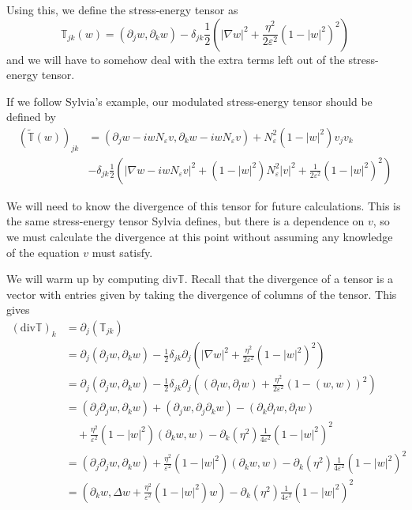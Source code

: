 \documentclass[a4paper]{article}
\renewcommand{\div}{\mathrm{div}}
\begin{document}
Using this, we define the stress-energy tensor as
\begin{equation} \label{eqn:stress_energy}
  \mathbb{T}_{jk}(w) = (\partial_j w, \partial_k w) - \delta_{jk} \frac{1}{2} \left( |\nabla w|^2 + \frac{\eta^2}{2 \varepsilon^2} (1-|w|^2)^2 \right)
\end{equation}
and we will have to somehow deal with the extra terms left out of the stress-energy tensor.

If we follow Sylvia's example, our modulated stress-energy tensor should be defined by
\begin{align} \label{eqn:mod_stress_energy}
  (\tilde{\mathbb{T}}(w))_{jk} &= (\partial_j w- i w N_\varepsilon v, \partial_k w - i w N_\varepsilon v) + N_\varepsilon^2 (1 - |w|^2) v_j v_k
  \nonumber \\
  &- \delta_{jk} \frac{1}{2} \left( |\nabla w - i w N_\varepsilon v|^2 + (1-|w|^2) N_\varepsilon^2 |v|^2 + \frac{1}{2 \varepsilon^2} (1 - |w|^2)^2
  \right)
\end{align}

We will need to know the divergence of this tensor for future calculations. This is the same stress-energy tensor Sylvia defines, but there is a
dependence on $v$, so we must calculate the divergence at this point without assuming any knowledge of the equation $v$ must satisfy.

We will warm up by computing $\div \mathbb{T}$. Recall that the divergence of a tensor is a vector with entries given by taking the divergence of
columns of the tensor. This gives
\begin{align}
  (\div \mathbb{T})_k &= \partial_j (\mathbb{T}_{jk}) \nonumber \\
  &= \partial_j (\partial_j w, \partial_k w) - \frac{1}{2} \delta_{jk} \partial_j \left( |\nabla w|^2 + \frac{\eta^2}{2 \varepsilon^2} (1-|w|^2)^2
  \right) \nonumber \\
  &= \partial_j (\partial_j w, \partial_k w) - \frac{1}{2} \delta_{jk} \partial_j \left( (\partial_l w, \partial_l w) + \frac{\eta^2}{2 \varepsilon^2}
  (1 - (w,w))^2 \right) \nonumber \\
  &= (\partial_j \partial_j w, \partial_k w) + (\partial_j w, \partial_j \partial_k w) - (\partial_k \partial_l w, \partial_l w) \nonumber \\
  &\quad + \frac{\eta^2}{\varepsilon^2} (1 - |w|^2) (\partial_k w, w) - \partial_k (\eta^2) \frac{1}{4 \varepsilon^2} (1 - |w|^2)^2 \nonumber \\
  &= (\partial_j \partial_j w, \partial_k w) + \frac{\eta^2}{\varepsilon^2} (1 - |w|^2) (\partial_k w, w) - \partial_k(\eta^2) \frac{1}{4
  \varepsilon^2} (1 - |w|^2)^2 \nonumber \\
  &= (\partial_k w, \Delta w + \frac{\eta^2}{\varepsilon^2} (1 - |w|^2)w) - \partial_k(\eta^2) \frac{1}{4\varepsilon^2} (1 - |w|^2)^2
  \label{eqn:div_stress_energy_comp}
\end{align}
\end{document}
